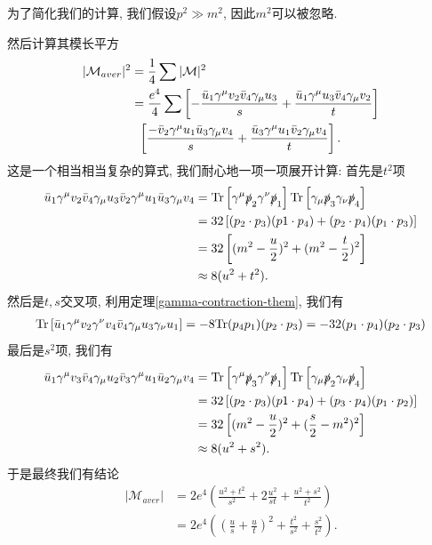 \begin{example}[Bhabha散射]
    为了简化我们的计算, 我们假设$p^2\gg m^2$, 因此$m^2$可以被忽略.

    然后计算其模长平方
    \begin{align}
        |\mathcal M_{aver}|^2&=\frac14\sum|\mathcal M|^2\\
        &=\frac{e^4}4\sum\left[-\frac{\bar u_1\gamma^\mu v_2\bar v_4\gamma_\mu u_3}{s}+\frac{\bar u_1\gamma^\mu u_3\bar v_4\gamma_\mu v_2}{t}\right]\notag\\
        &\;\;\left[\frac{-\bar v_2\gamma^\mu u_1\bar u_3\gamma_\mu v_4}{s}+\frac{\bar u_3\gamma^\mu u_1\bar v_2\gamma_\mu v_4}{t}\right].
    \end{align}
    这是一个相当相当复杂的算式, 我们耐心地一项一项展开计算: 首先是$t^2$项
    \begin{align}
        \bar u_1\gamma^\mu v_2\bar v_4\gamma_\mu u_3\bar v_2\gamma^\mu u_1\bar u_3\gamma_\mu v_4&=\rm{Tr}\left[\gamma^\mu\slashed p_2\gamma^\nu\slashed p_1\right]\rm{Tr}\left[\gamma_\mu\slashed p_3\gamma_\nu\slashed p_4\right]\\
        &=32\left[(p_2\cdot p_3)(p1\cdot p_4)+(p_2\cdot p_4)(p_1\cdot p_3)\right]\\
        &=32\left[(m^2-\frac u2)^2+(m^2-\frac t2)^2\right]\\
        &\approx8(u^2+t^2).
    \end{align}
    然后是$t, s$交叉项, 利用定理\ref{gamma-contraction-them}, 我们有
    \begin{align}
        \rm{Tr}\left[\bar u_1\gamma^\mu v_2\gamma^\nu v_4\bar v_4\gamma_\mu u_3\gamma_\nu u_1\right]=-8\rm{Tr}(\sl p_4\sl p_1)(p_2\cdot p_3)=-32(p_1\cdot p_4)(p_2\cdot p_3)
    \end{align}
    最后是$s^2$项, 我们有
    \begin{align}
        \bar u_1\gamma^\mu v_3\bar v_4\gamma_\mu u_2\bar v_3\gamma^\mu u_1\bar u_2\gamma_\mu v_4&=\rm{Tr}\left[\gamma^\mu\slashed p_3\gamma^\nu\slashed p_1\right]\rm{Tr}\left[\gamma_\mu\slashed p_2\gamma_\nu\slashed p_4\right]\\
        &=32\left[(p_2\cdot p_3)(p1\cdot p_4)+(p_3\cdot p_4)(p_1\cdot p_2)\right]\\
        &=32\left[(m^2-\frac u2)^2+(\frac s2-m^2)^2\right]\\
        &\approx8(u^2+s^2).
    \end{align}
    于是最终我们有结论
    \begin{align}
        |\mathcal M_{aver}|&=2e^4\left(\frac{u^2+t^2}{s^2}+2\frac{u^2}{st}+\frac{u^2+s^2}{t^2}\right)\\
        &=2e^4\left((\frac us+\frac ut)^2+\frac{t^2}{s^2}+\frac{s^2}{t^2}\right).
    \end{align}


\end{example}
